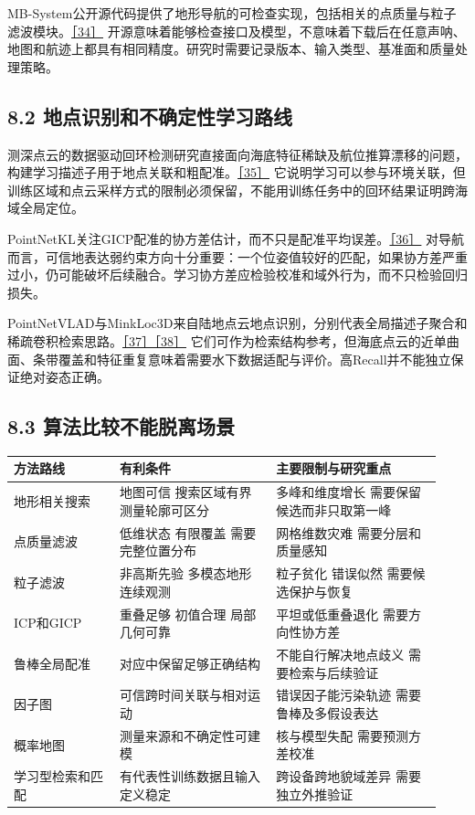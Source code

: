 MB-System公开源代码提供了地形导航的可检查实现，包括相关的点质量与粒子滤波模块。\href{https://github.com/dwcaress/MB-System}{［34］} 开源意味着能够检查接口及模型，不意味着下载后在任意声呐、地图和航迹上都具有相同精度。研究时需要记录版本、输入类型、基准面和质量处理策略。

\hypertarget{ux5730ux70b9ux8bc6ux522bux548cux4e0dux786eux5b9aux6027ux5b66ux4e60ux8defux7ebf}{%
\subsection{8.2 地点识别和不确定性学习路线}\label{ux5730ux70b9ux8bc6ux522bux548cux4e0dux786eux5b9aux6027ux5b66ux4e60ux8defux7ebf}}

测深点云的数据驱动回环检测研究直接面向海底特征稀缺及航位推算漂移的问题，构建学习描述子用于地点关联和粗配准。\href{https://arxiv.org/abs/2209.08578}{［35］} 它说明学习可以参与环境关联，但训练区域和点云采样方式的限制必须保留，不能用训练任务中的回环结果证明跨海域全局定位。

PointNetKL关注GICP配准的协方差估计，而不只是配准平均误差。\href{https://arxiv.org/abs/2003.10931}{［36］} 对导航而言，可信地表达弱约束方向十分重要：一个位姿值较好的匹配，如果协方差严重过小，仍可能破坏后续融合。学习协方差应检验校准和域外行为，而不只检验回归损失。

PointNetVLAD与MinkLoc3D来自陆地点云地点识别，分别代表全局描述子聚合和稀疏卷积检索思路。\href{https://arxiv.org/abs/1804.03492}{［37］}\href{https://arxiv.org/abs/2011.04530}{［38］} 它们可作为检索结构参考，但海底点云的近单曲面、条带覆盖和特征重复意味着需要水下数据适配与评价。高Recall并不能独立保证绝对姿态正确。

\hypertarget{ux7b97ux6cd5ux6bd4ux8f83ux4e0dux80fdux8131ux79bbux573aux666f}{%
\subsection{8.3 算法比较不能脱离场景}\label{ux7b97ux6cd5ux6bd4ux8f83ux4e0dux80fdux8131ux79bbux573aux666f}}

\begin{longtable}[]{@{}p{0.23\linewidth}p{0.34\linewidth}p{0.36\linewidth}@{}}
\toprule
方法路线 & 有利条件 & 主要限制与研究重点\tabularnewline
\midrule
\endhead
地形相关搜索 & 地图可信 搜索区域有界 测量轮廓可区分 & 多峰和维度增长 需要保留候选而非只取第一峰\tabularnewline
点质量滤波 & 低维状态 有限覆盖 需要完整位置分布 & 网格维数灾难 需要分层和质量感知\tabularnewline
粒子滤波 & 非高斯先验 多模态地形 连续观测 & 粒子贫化 错误似然 需要候选保护与恢复\tabularnewline
ICP和GICP & 重叠足够 初值合理 局部几何可靠 & 平坦或低重叠退化 需要方向性协方差\tabularnewline
鲁棒全局配准 & 对应中保留足够正确结构 & 不能自行解决地点歧义 需要检索与后续验证\tabularnewline
因子图 & 可信跨时间关联与相对运动 & 错误因子能污染轨迹 需要鲁棒及多假设表达\tabularnewline
概率地图 & 测量来源和不确定性可建模 & 核与模型失配 需要预测方差校准\tabularnewline
学习型检索和匹配 & 有代表性训练数据且输入定义稳定 & 跨设备跨地貌域差异 需要独立外推验证\tabularnewline
\bottomrule
\end{longtable}

